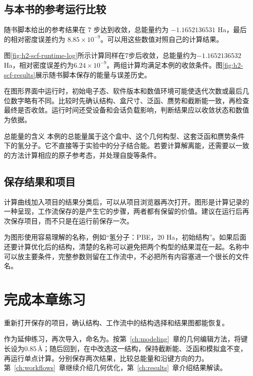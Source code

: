 \subsection{与本书的参考运行比较}

随书脚本给出的参考结果在 $7$ 步达到收敛，总能量约为 $-1.1652136531$ Ha，最后的相对密度误差约为 $8.85\times10^{-9}$。可以用这些数值对照自己的计算结果。

图\ref{fig:h2-scf-runtime-log}所示计算同样在7步后收敛，总能量约为$-1.1652136532$ Ha，相对密度误差约为$6.24\times10^{-9}$。两组计算均满足本例的收敛条件。图\ref{fig:h2-scf-results}展示随书脚本保存的能量与误差历史。

在图形界面中运行时，初始电子态、软件版本和数值环境可能使迭代次数或最后几位数字略有不同。比较时先确认结构、盒尺寸、泛函、赝势和截断能一致，再检查最终是否收敛。运行时间还受设备和会话负载影响，判断结果应以收敛状态和数值为依据。

\begin{notebox}{总能量的含义}
本例的总能量属于这个盒中、这个几何构型、这套泛函和赝势条件下的氢分子。它不直接等于实验中的分子结合能。若要计算解离能，还需要以一致的方法计算相应的原子参考态，并处理自旋等条件。
\end{notebox}

\subsection{保存结果和项目}

计算曲线加入项目的结果分类后，可以从项目浏览器再次打开。图形是计算记录的一种呈现，工作流保存的是产生它的步骤，两者都有保留的价值。建议在运行后再次保存项目，而不只是在运行前保存一次。

为图形使用容易理解的名称，例如“氢分子：PBE，20 Ha，初始结构”。如果后面还要计算优化后的结构，清楚的名称可以避免把两个构型的结果混在一起。名称中可以放主要条件，完整参数则留在工作流中，不必把所有内容塞进一个很长的文件名。

\section{完成本章练习}

重新打开保存的项目，确认结构、工作流中的结构选择和结果图都能恢复。

作为延伸练习，再次导入，命名为。按第~\ref{ch:modeling}~章的几何编辑方法，将键长设为$0.85\,\text{\AA}$；随后回到，在中改选这一结构，保持截断能、泛函和模拟盒不变，再运行单点计算。分别保存两次结果，比较总能量和沿键方向的力。第~\ref{ch:workflows}~章继续介绍几何优化，第~\ref{ch:results}~章介绍结果解读。

